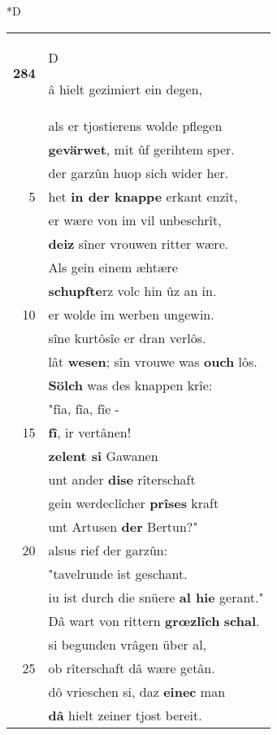 \documentclass[8pt,a4paper,notitlepage]{article}
\begin{document}
\begin{table}[ht]
\begin{minipage}[t]{0.5\linewidth}
\small
\begin{center}*D
\end{center}
\begin{tabular}{rl}
\textbf{284} & \begin{large}D\end{large}â hielt gezimiert ein degen,\\ 
 & als er tjostierens wolde pflegen\\ 
 & \textbf{gevärwet}, mit ûf gerihtem sper.\\ 
 & der garzûn huop sich wider her.\\ 
5 & het \textbf{in der knappe} erkant enzît,\\ 
 & er wære von im vil unbeschrît,\\ 
 & \textbf{deiz} sîner vrouwen ritter wære.\\ 
 & Als gein einem æhtære\\ 
 & \textbf{schupfte}rz volc hin ûz an in.\\ 
10 & er wolde im werben ungewin.\\ 
 & sîne kurtôsîe er dran verlôs.\\ 
 & lât \textbf{wesen}; sîn vrouwe was \textbf{ouch} lôs.\\ 
 & \textbf{Sölch} was des knappen krîe:\\ 
 & "fîa, fîa, fîe -\\ 
15 & \textbf{fî}, ir vertânen!\\ 
 & \textbf{zelent si} Gawanen\\ 
 & unt ander \textbf{dise} rîterschaft\\ 
 & gein werdeclîcher \textbf{prîses} kraft\\ 
 & unt Artusen \textbf{der} Bertun?"\\ 
20 & alsus rief der garzûn:\\ 
 & "tavelrunde ist geschant.\\ 
 & iu ist durch die snüere \textbf{al hie} gerant."\\ 
 & Dâ wart von rittern \textbf{grœzlîch} \textbf{schal}.\\ 
 & si begunden vrâgen über al,\\ 
25 & ob rîterschaft dâ wære getân.\\ 
 & dô vrieschen si, daz \textbf{einec} man\\ 
 & \textbf{dâ} hielt zeiner tjost bereit.\\ 

\end{tabular}
\end{minipage}
\end{table}
\end{document}
